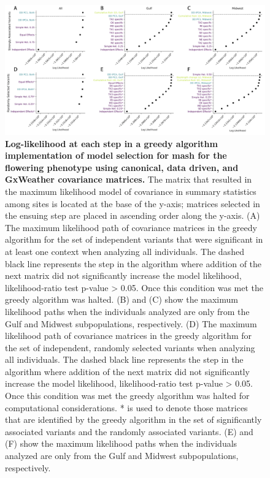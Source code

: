 \documentclass[
  letterpaper,
  DIV=11,
  numbers=noendperiod]{scrartcl}
\begin{document}
\begin{figure}[H]

{\centering \includegraphics{images/RR_Figure4.png}

}

\caption{\textbf{Log-likelihood at each step in a greedy algorithm
implementation of model selection for mash for the flowering phenotype
using canonical, data driven, and GxWeather covariance matrices.} The
matrix that resulted in the maximum likelihood model of covariance in
summary statistics among sites is located at the base of the y-axis;
matrices selected in the ensuing step are placed in ascending order
along the y-axis. (A) The maximum likelihood path of covariance matrices
in the greedy algorithm for the set of independent variants that were
significant in at least one context when analyzing all individuals. The
dashed black line represents the step in the algorithm where addition of
the next matrix did not significantly increase the model likelihood,
likelihood-ratio test p-value \textgreater{} 0.05. Once this condition
was met the greedy algorithm was halted. (B) and (C) show the maximum
likelihood paths when the individuals analyzed are only from the Gulf
and Midwest subpopulations, respectively. (D) The maximum likelihood
path of covariance matrices in the greedy algorithm for the set of
independent, randomly selected variants when analyzing all individuals.
The dashed black line represents the step in the algorithm where
addition of the next matrix did not significantly increase the model
likelihood, likelihood-ratio test p-value \textgreater{} 0.05. Once this
condition was met the greedy algorithm was halted for computational
considerations. * is used to denote those matrices that are identified
by the greedy algorithm in the set of significantly associated variants
and the randomly associated variants. (E) and (F) show the maximum
likelihood paths when the individuals analyzed are only from the Gulf
and Midwest subpopulations, respectively.}

\end{figure}%
\end{document}
